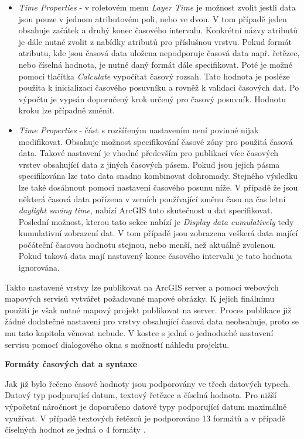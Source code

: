 \begin{itemize}
	\item \textit{Time Properties} - v roletovém menu \textit{Layer Time} je možnost zvolit jestli data jsou pouze v jednom atributovém poli, nebo ve dvou. V tom případě jeden obsahuje začátek a druhý konec časového intervalu. Konkrétní názvy atributů je dále nutné zvolit z nabídky atributů pro příslušnou vrstvu. Pokud formát atributu, kde jsou časová data uložena nepodporuje časová data např. řetězec, nebo číselná hodnota, je nutné daný formát dále specifikovat. Poté je možné pomocí tlačítka \textit{Calculate} vypočítat časový rozsah. Tato hodnota je posléze použita k inicializaci časového posuvníku a rovněž k validaci časových dat. Po výpočtu je vypsán doporučený krok určený pro časový posuvník. Hodnotu kroku lze případně změnit. 
	
	\item \textit{Time Properties} - část s rozšířeným nastavením není povinné nijak modifikovat. Obsahuje možnost specifikování časové zóny pro použitá časová data. Takové nastavení je vhodné především pro publikací více časových vrstev obsahující data z jiných časových pásem. Pokud jsou jejich pásma specifikována lze tato data snadno kombinovat dohromady. Stejného výsledku lze také dosáhnout pomoci nastavení časového posunu níže. V případě že jsou některá časová data pořízena v zemích používající změnu času na čas letní \textit{daylight saving time}, nabízí ArcGIS tuto skutečnost u dat specifikovat. Poslední možnost, kterou tato sekce nabízí je \textit{Display data cumulatively} tedy kumulativní zobrazení dat. V tom případě jsou zobrazena veškerá data mající počáteční časovou hodnotu stejnou, nebo menší, než aktuálně zvolenou. Pokud taková data mají nastavený konec časového intervalu je tato hodnota ignorována. 
\end{itemize}

Takto nastavené vrstvy lze publikovat na ArcGIS server a pomocí webových mapových servisů vytvářet požadované mapové obrázky. K jejich finálnímu použití je však nutné mapový projekt publikovat na server. Proces publikace již žádné dodatečné nastavení pro vrstvy obsahující časová data neobsahuje, proto se mu tato kapitola věnovat nebude. V kostce s jedná o jednoduché nastavení servisu pomocí dialogového okna s možností náhledu projektu.

\bigskip
\noindent
\textbf{Formáty časových dat a syntaxe}

Jak již bylo řečeno časové hodnoty jsou podporovány ve třech datových typech. Datový typ podporující datum, textový řetězec a číselná hodnota. Pro nižší výpočetní náročnost je doporučeno datové typy podporující datum maximálně využívat. V případě textových řetězců je podporováno 13 formátů a v případě číselných hodnot se jedná o 4 formáty \cite{arcgiq-data-types}.

